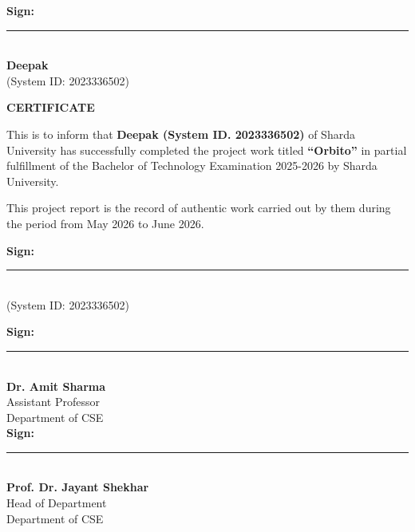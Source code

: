 \documentclass[12pt,a4paper]{article}
\begin{document}
\noindent
\textbf{Sign: }\rule{4.5cm}{0.6pt}\\[0.3cm]
\textbf{Deepak}\\
(System ID: 2023336502)

\newpage

\vspace*{0pt}
\begin{center}
    {\Large\bfseries CERTIFICATE\par}
\end{center}
\vspace{0.8cm}

\noindent
This is to inform that \textbf{Deepak (System ID. 2023336502)} of Sharda University has successfully completed the project work titled \textbf{``Orbito''} in partial fulfillment of the Bachelor of Technology Examination 2025-2026 by Sharda University.

\vspace{0.8cm}
\noindent
This project report is the record of authentic work carried out by them during the period from May 2026 to June 2026.

\vspace{2.5cm}

\noindent
\begin{minipage}[t]{0.45\textwidth}
    \vspace{0pt}
    \textbf{Sign: }\rule{4.5cm}{0.6pt}\\[0.3cm]
    (System ID: 2023336502)\\[0.15cm]
\end{minipage}
\hfill
\begin{minipage}[t]{0.48\textwidth}
    \vspace{0pt}
    \begin{flushright}
        \textbf{Sign: }\rule{4.5cm}{0.6pt}\\[0.3cm]
        \textbf{Dr. Amit Sharma}\\
        Assistant Professor\\
        Department of CSE\\[1.5cm]
        \textbf{Sign: }\rule{4.5cm}{0.6pt}\\[0.3cm]
        \textbf{Prof. Dr. Jayant Shekhar}\\
        {Head of Department}\\
        Department of CSE\\[1.5cm]
    \end{flushright}
\end{minipage}
\end{document}
